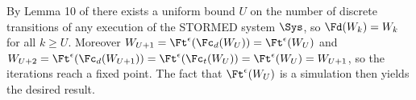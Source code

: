 \begin{prf}
By Lemma 10 of \cite{VladimerouPVD08_STORMED} there exists a uniform bound $U$ on the number of discrete transitions of any execution of the STORMED system $\Sys$, so $\Fd(W_k) = W_k$ for all $k\geq U$.
Moreover 
$W_{U+1} = \Ft^\epsilon(\Fc_d(W_U)) = \Ft^\epsilon(W_U)$
and $W_{U+2}= \Ft^\epsilon(\Fc_d(W_{U+1}))= \Ft^\epsilon(\Fc_t(W_U)) = \Ft^\epsilon(W_U) = W_{U+1}$, so the iterations reach a fixed point.
The fact that $\Ft^\epsilon(W_U)$ is a simulation then yields the desired result.
\end{prf}
%


